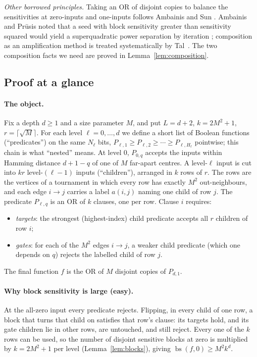 \documentclass[11pt]{article}
\newcommand{\bs}{\operatorname{bs}}
\theoremstyle{definition}
\theoremstyle{remark}
\begin{document}
\emph{Other borrowed principles.} Taking an OR of disjoint copies to balance
the sensitivities at zero-inputs and one-inputs follows Ambainis and Sun
\cite[Section~4, Lemma~1]{AmbainisSun2011}. Ambainis and Pr\={u}sis noted
that a seed with block sensitivity greater than sensitivity squared would
yield a superquadratic power separation by iteration
\cite[Section~1]{AmbainisPrusis2014}; composition as an amplification method
is treated systematically by Tal~\cite{Tal2013}. The two composition facts
we need are proved in Lemma~\ref{lem:composition}.

\subsection{Proof at a glance}
\label{sec:glance}

\paragraph{The object.}
Fix a depth \(d\ge1\) and a size parameter \(M\), and put \(L=d+2\),
\(k=2M^2+1\), \(r=\lceil\sqrt M\rceil\). For each level
\(\ell=0,\ldots,d\) we define a short list of Boolean functions
(``predicates'') on the same \(N_\ell\) bits,
\(P_{\ell,1}\ge P_{\ell,2}\ge\cdots\ge P_{\ell,H_\ell}\) pointwise; this chain
is what ``nested'' means. At level \(0\), \(P_{0,q}\) accepts the inputs
within Hamming distance \(d+1-q\) of one of \(M\) far-apart centres. A
level-\(\ell\) input is cut into \(kr\) level-\((\ell-1)\) inputs
(``children''), arranged in \(k\) rows of \(r\). The rows are the vertices of
a tournament in which every row has exactly \(M^2\) out-neighbours, and each
edge \(i\to j\) carries a label \(a(i,j)\) naming one child of row \(j\).
The predicate \(P_{\ell,q}\) is an OR of \(k\) clauses, one per row.
Clause \(i\) requires:
\begin{itemize}[nosep]
\item \emph{targets}: the strongest (highest-index) child predicate accepts
 all \(r\) children of row \(i\);
\item \emph{gates}: for each of the \(M^2\) edges \(i\to j\), a weaker child
 predicate (which one depends on \(q\)) rejects the labelled child of row
 \(j\).
\end{itemize}
The final function \(f\) is the OR of \(M\) disjoint copies of \(P_{d,1}\).

\paragraph{Why block sensitivity is large (easy).}
At the all-zero input every predicate rejects. Flipping, in every child of
one row, a block that turns that child on satisfies that row's clause: its
targets hold, and its gate children lie in other rows, are untouched, and
still reject. Every one of the \(k\) rows can be used, so the number of
disjoint sensitive blocks at zero is multiplied by \(k=2M^2+1\) per level
(Lemma~\ref{lem:blocks}), giving \(\bs(f,0)\ge M^2k^d\).
\end{document}

